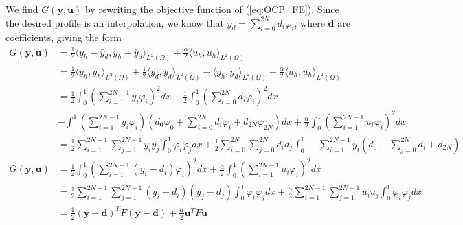 We find $G(\mathbf{y, u})$ by rewriting the objective function of (\ref{eq:OCP_FE}).
Since the desired profile is an interpolation, we know that $\bar{y}_d = \sum_{i=0}^{2N}d_i\varphi_i$, where $\mathbf{d}$ are coefficients, giving the form
\begin{align*}
    G(\mathbf{y, u}) &= \frac{1}{2}\langle y_h - \bar{y}_d, y_h - \bar{y}_d \rangle_{L^2{(\Omega)}} + \frac{\alpha}{2} \langle u_h, u_h \rangle_{L^2(\Omega)} \\
   &= \frac{1}{2}\langle y_h , y_h \rangle_{L^2{(\Omega)}} +  \frac{1}{2}\langle \bar{y}_d ,\bar{y}_d  \rangle_{L^2{(\Omega)}}
   - \langle y_h, \bar{y}_d \rangle_{L^2{(\Omega)}} + \frac{\alpha}{2} \langle u_h, u_h \rangle_{L^2(\Omega)} \\
     &= \frac{1}{2}\int_0^1\left( \sum_{i=1}^{2N-1}y_i \varphi_i \right)^2dx  + \frac{1}{2}\int_0^1\left( \sum_{i=0}^{2N}d_i \varphi_i \right)^2dx \\
     &- \int_0^1\left( \sum_{i=1}^{2N-1}y_i \varphi_i \right) \left(d_0 \varphi_0 + \sum_{i=0}^{2N} d_i \varphi_i + d_{2N} \varphi_{2N} \right)dx + 
     \frac{\alpha}{2}\int_0^1\left(\sum_{i=1}^{2N-1} u_i \varphi_i  \right)^2dx \\    
     &= \frac{1}{2}\sum_{i=1}^{2N-1}\sum_{j=1}^{2N-1} y_i y_j \int_0^1 \varphi_i \varphi_j dx + \frac{1}{2}\sum_{i=0}^{2N}\sum_{j=0}^{2N} d_i d_j \int_0^1
    - \sum_{i=1}^{2N-1} y_i \left( d_0 + \sum_{j=0}^{2N} d_i  + d_{2N}  \right)  
\end{align*}
\begin{align*}
    G(\mathbf{y, u}) &= \frac{1}{2}\int_0^1\left( \sum_{i=1}^{2N-1}\left( y_i -d_i\right) \varphi_i \right)^2dx + \frac{\alpha}{2}\int_0^1\left(\sum_{i=1}^{2N-1} u_i \varphi_i  \right)^2dx \\    
    &=\frac{1}{2} \sum_{i=1}^{2N-1}\sum_{j=1}^{2N-1}\left( y_i -d_i\right)\left( y_j -d_j\right) \int_0^1  \varphi_i \varphi_j dx + \frac{\alpha}{2}\sum_{i=1}^{2N-1}\sum_{j=1}^{2N-1} u_i u_j\int_0^1
     \varphi_i \varphi_j dx    \\
     &= \frac{1}{2} \left( \mathbf{y} - \mathbf{d} \right)^T F \left( \mathbf{y} - \mathbf{d} \right) + \frac{\alpha}{2}\mathbf{u}^T F \mathbf{u} 
\end{align*}


